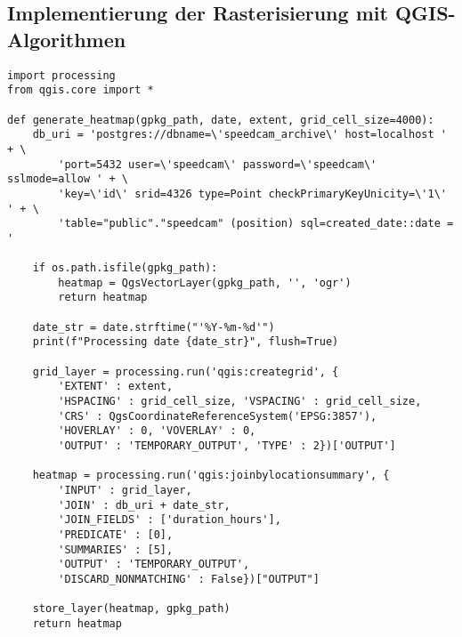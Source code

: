 \subsection{Implementierung der Rasterisierung mit QGIS-Algorithmen}
\label{sec:QgisRasterisierung}

\begin{code}
\begin{verbatim}
import processing
from qgis.core import *

def generate_heatmap(gpkg_path, date, extent, grid_cell_size=4000):
    db_uri = 'postgres://dbname=\'speedcam_archive\' host=localhost ' + \
        'port=5432 user=\'speedcam\' password=\'speedcam\' sslmode=allow ' + \
        'key=\'id\' srid=4326 type=Point checkPrimaryKeyUnicity=\'1\' ' + \
        'table="public"."speedcam" (position) sql=created_date::date = '

    if os.path.isfile(gpkg_path):
        heatmap = QgsVectorLayer(gpkg_path, '', 'ogr')
        return heatmap

    date_str = date.strftime("'%Y-%m-%d'")
    print(f"Processing date {date_str}", flush=True)
    
    grid_layer = processing.run('qgis:creategrid', {
        'EXTENT' : extent,
        'HSPACING' : grid_cell_size, 'VSPACING' : grid_cell_size,
        'CRS' : QgsCoordinateReferenceSystem('EPSG:3857'),
        'HOVERLAY' : 0, 'VOVERLAY' : 0,
        'OUTPUT' : 'TEMPORARY_OUTPUT', 'TYPE' : 2})['OUTPUT']

    heatmap = processing.run('qgis:joinbylocationsummary', {
        'INPUT' : grid_layer,
        'JOIN' : db_uri + date_str,
        'JOIN_FIELDS' : ['duration_hours'],
        'PREDICATE' : [0],
        'SUMMARIES' : [5],
        'OUTPUT' : 'TEMPORARY_OUTPUT',
        'DISCARD_NONMATCHING' : False})["OUTPUT"]

    store_layer(heatmap, gpkg_path)
    return heatmap
\end{verbatim}
\label{lst:GenerateHeatmapFunction}
\end{code}

